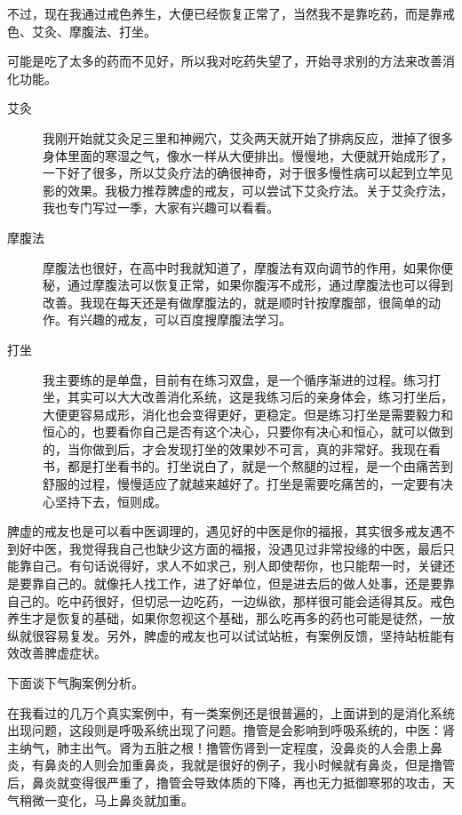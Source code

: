 \documentclass{ctexart}
\begin{document}
不过，现在我通过戒色养生，大便已经恢复正常了，当然我不是靠吃药，而是靠戒色、艾灸、摩腹法、打坐。

可能是吃了太多的药而不见好，所以我对吃药失望了，开始寻求别的方法来改善消化功能。

\begin{description}
    \item[艾灸] 我刚开始就艾灸足三里和神阙穴，艾灸两天就开始了排病反应，泄掉了很多身体里面的寒湿之气，像水一样从大便排出。慢慢地，大便就开始成形了，一下好了很多，所以艾灸疗法的确很神奇，对于很多慢性病可以起到立竿见影的效果。我极力推荐脾虚的戒友，可以尝试下艾灸疗法。关于艾灸疗法，我也专门写过一季，大家有兴趣可以看看。
    \item[摩腹法] 摩腹法也很好，在高中时我就知道了，摩腹法有双向调节的作用，如果你便秘，通过摩腹法可以恢复正常，如果你腹泻不成形，通过摩腹法也可以得到改善。我现在每天还是有做摩腹法的，就是顺时针按摩腹部，很简单的动作。有兴趣的戒友，可以百度搜摩腹法学习。
    \item[打坐] 我主要练的是单盘，目前有在练习双盘，是一个循序渐进的过程。练习打坐，其实可以大大改善消化系统，这是我练习后的亲身体会，练习打坐后，大便更容易成形，消化也会变得更好，更稳定。但是练习打坐是需要毅力和恒心的，也要看你自己是否有这个决心，只要你有决心和恒心，就可以做到的，当你做到后，才会发现打坐的效果妙不可言，真的非常好。我现在看书，都是打坐看书的。打坐说白了，就是一个熬腿的过程，是一个由痛苦到舒服的过程，慢慢适应了就越来越好了。打坐是需要吃痛苦的，一定要有决心坚持下去，恒则成。
\end{description}

脾虚的戒友也是可以看中医调理的，遇见好的中医是你的福报，其实很多戒友遇不到好中医，我觉得我自己也缺少这方面的福报，没遇见过非常投缘的中医，最后只能靠自己。有句话说得好，求人不如求己，别人即使帮你，也只能帮一时，关键还是要靠自己的。就像托人找工作，进了好单位，但是进去后的做人处事，还是要靠自己的。吃中药很好，但切忌一边吃药，一边纵欲，那样很可能会适得其反。戒色养生才是恢复的基础，如果你忽视这个基础，那么吃再多的药也可能是徒然，一放纵就很容易复发。另外，脾虚的戒友也可以试试站桩，有案例反馈，坚持站桩能有效改善脾虚症状。

下面谈下气胸案例分析。

在我看过的几万个真实案例中，有一类案例还是很普遍的，上面讲到的是消化系统出现问题，这段则是呼吸系统出现了问题。撸管是会影响到呼吸系统的，中医：肾主纳气，肺主出气。肾为五脏之根！撸管伤肾到一定程度，没鼻炎的人会患上鼻炎，有鼻炎的人则会加重鼻炎，我就是很好的例子，我小时候就有鼻炎，但是撸管后，鼻炎就变得很严重了，撸管会导致体质的下降，再也无力抵御寒邪的攻击，天气稍微一变化，马上鼻炎就加重。
\end{document}
